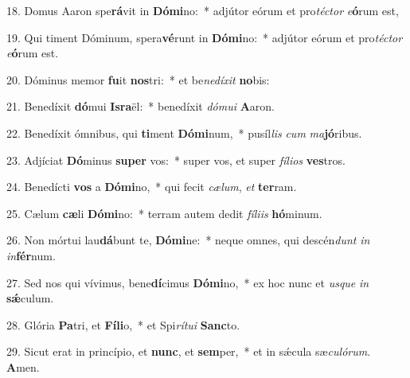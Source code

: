 18. Domus Aaron spe\textbf{rá}vit in \textbf{Dó}\textbf{mi}no:~*  adjútor eórum et pro\textit{téc}\textit{tor} \textit{e}\textbf{ó}rum est,\

19. Qui timent Dóminum, spera\textbf{vé}runt in \textbf{Dó}\textbf{mi}no:~*  adjútor eórum et pro\textit{téc}\textit{tor} \textit{e}\textbf{ó}rum est.\

20. Dóminus memor \textbf{fu}it \textbf{nos}tri:~*  et be\textit{ne}\textit{dí}\textit{xit} \textbf{no}bis:\

21. Benedíxit \textbf{dó}mui \textbf{Is}\textbf{ra}ël:~*  benedíxit \textit{dó}\textit{mu}\textit{i} \textbf{A}aron.\

22. Benedíxit ómnibus, qui \textbf{ti}ment \textbf{Dó}\textbf{mi}num,~*  pusíl\textit{lis} \textit{cum} \textit{ma}\textbf{jó}ribus.\

23. Adjíciat \textbf{Dó}minus \textbf{su}\textbf{per} vos:~*  super vos, et super \textit{fí}\textit{li}\textit{os} \textbf{ves}tros.\

24. Benedícti \textbf{vos} a \textbf{Dó}\textbf{mi}no,~*  qui fecit \textit{cæ}\textit{lum}, \textit{et} \textbf{ter}ram.\

25. Cælum \textbf{cæ}li \textbf{Dó}\textbf{mi}no:~*  terram autem dedit \textit{fí}\textit{li}\textit{is} \textbf{hó}minum.\

26. Non mórtui lau\textbf{dá}bunt te, \textbf{Dó}\textbf{mi}ne:~*  neque omnes, qui descén\textit{dunt} \textit{in} \textit{in}\textbf{fér}num.\

27. Sed nos qui vívimus, bene\textbf{dí}cimus \textbf{Dó}\textbf{mi}no,~*  ex hoc nunc et \textit{us}\textit{que} \textit{in} \textbf{sǽ}culum.\

28. Glória \textbf{Pa}tri, et \textbf{Fí}\textbf{li}o,~*  et Spi\textit{rí}\textit{tu}\textit{i} \textbf{Sanc}to.\

29. Sicut erat in princípio, et \textbf{nunc}, et \textbf{sem}per,~*  et in sǽcula sæ\textit{cu}\textit{ló}\textit{rum}. \textbf{A}men.\

